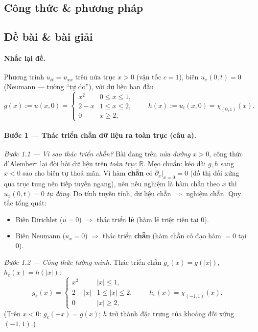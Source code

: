 \subsection*{Công thức \& phương pháp}


\subsection*{Đề bài \& bài giải}
\paragraph{Nhắc lại đề.} Phương trình $u_{tt}=u_{xx}$ trên nửa trục $x>0$ (vận tốc $c=1$), biên $u_x(0,t)=0$ (Neumann --- tường ``tự do''),
với dữ liệu ban đầu
\[
  g(x):=u(x,0)=\begin{cases}x^2 & 0\le x\le1,\\ 2-x & 1\le x\le2,\\ 0 & x\ge2,\end{cases}
  \qquad
  h(x):=u_t(x,0)=\chi_{(0,1)}(x).
\]

\paragraph{Bước 1 --- Thác triển chẵn dữ liệu ra toàn trục (câu a).}\leavevmode

\emph{Bước 1.1 --- Vì sao thác triển chẵn?} Bài đang trên \emph{nửa đường} $x>0$, công thức d'Alembert lại đòi hỏi dữ liệu trên \emph{toàn trục} $\mathbb{R}$. Mẹo chuẩn: kéo dài $g,h$ sang $x<0$ sao cho biên tự thoả mãn. Vì hàm \textbf{chẵn} có $\partial_x|_{x=0}=0$ (đồ thị đối xứng qua trục tung nên tiếp tuyến ngang), nên nếu nghiệm là hàm chẵn theo $x$ thì $u_x(0,t)=0$ \emph{tự động}. Do tính tuyến tính, dữ liệu chẵn $\Rightarrow$ nghiệm chẵn. Quy tắc tổng quát:
\begin{itemize}
\item Biên Dirichlet ($u=0$) $\Rightarrow$ thác triển \textbf{lẻ} (hàm lẻ triệt tiêu tại $0$).
\item Biên Neumann ($u_x=0$) $\Rightarrow$ thác triển \textbf{chẵn} (hàm chẵn có đạo hàm $=0$ tại $0$).
\end{itemize}

\emph{Bước 1.2 --- Công thức tường minh.} Thác triển chẵn $g_e(x)=g(|x|)$, $h_e(x)=h(|x|)$:
\[
  g_e(x)=\begin{cases}
    x^2 & |x|\le 1,\\
    2-|x| & 1\le |x|\le 2,\\
    0 & |x|\ge 2,
  \end{cases}
  \qquad
  h_e(x)=\chi_{(-1,1)}(x).
\]
(Trên $x<0$: $g_e(-x)=g(x)$; $h$ trở thành đặc trưng của khoảng đối xứng $(-1,1)$.)

